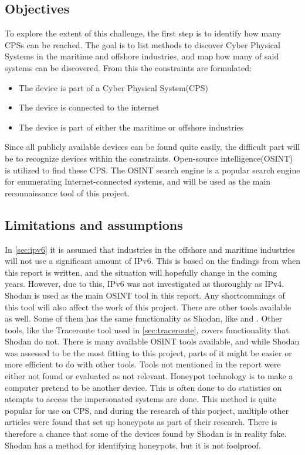 \subsection{Objectives}
To explore the extent of this challenge, the first step is to identify how many CPSs can be reached. The goal is to list methods to discover Cyber Physical Systems in the maritime and offshore industries, and map how many of said systems can be discovered. From this the constraints are formulated:
\begin{itemize}
    \item The device is part of a Cyber Physical System(CPS)
    \item The device is connected to the internet
    \item The device is part of either the maritime or offshore industries
\end{itemize}
Since all publicly available devices can be found quite easily, the difficult part will be to recognize devices within the constraints.
Open-source intelligence(OSINT) is utilized to find these CPS. The OSINT search engine \href{https://shodan.io}{\color{blue}{Shodan}} is a popular search engine for enumerating Internet-connected systems, and will be used as the main reconnaissance tool of this project. 

\subsection{Limitations and assumptions}
In \cref{sec:ipv6} it is assumed that industries in the offshore and maritime industries will not use a significant amount of IPv6. This is based on the findings from when this report is written, and the situation will hopefully change in the coming years. However, due to this, IPv6 was not investigated as thoroughly as IPv4.
Shodan is used as the main OSINT tool in this report. Any shortcommings of this tool will also affect the work of this project.
There are other tools available as well. Some of them has the same functionality as Shodan, like \href{https://censys.io/}{\color{blue}{Censys}} and \href{www.zoomeye.org}{\color{blue}{ZoomEye}}. Other tools, like the Traceroute tool used in \cref{sec:traceroute}, covers functionality that Shodan do not. There is many available OSINT tools available, and while Shodan was assessed to be the most fitting to this project, parts of it might be easier or more efficient to do with other tools. Tools not mentioned in the report were either not found or evaluated as not relevant.
Honeypot technology is to make a computer pretend to be another device. This is often done to do statistics on atempts to access the impersonated systems are done. This method is quite popular for use on CPS, and during the research of this porject, multiple other articles were found that set up honeypots as part of their research.\cite{bodenheim_butts_dunlap_mullins_2014}\cite{ICS_shodan_article} There is therefore a chance that some of the devices found by Shodan is in reality fake. Shodan has a method for identifying honeypots, but it is not foolproof.


